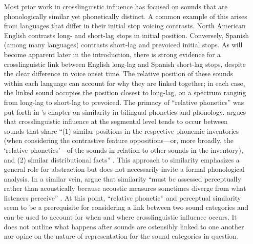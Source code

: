Most prior work in crosslinguistic influence has focused on sounds that are phonologically similar yet phonetically distinct. A common example of this arises from languages that differ in their initial stop voicing contrasts. North American English contrasts long- and short-lag stops in initial position. Conversely, Spanish (among many languages) contrasts short-lag and prevoiced initial stops. As will become apparent later in the introduction, there is strong evidence for a crosslinguistic link between English long-lag and Spanish short-lag stops, despite the clear difference in voice onset time. The relative position of these sounds within each language can account for why they are linked together; in each case, the linked sound occupies the position closest to long-lag, on a spectrum ranging from long-lag to short-lag to prevoiced. The primacy of ``relative phonetics'' was put forth in \citeauthor{chang_2015_similarity}'s \citeyearpar{chang_2015_similarity} chapter on similarity in bilingual phonetics and phonology. \citeauthor{chang_2015_similarity} argues that crosslinguistic influence at the segmental level tends to occur between sounds that share ``(1) similar positions in the respective phonemic inventories (when considering the contrastive feature oppositions---or, more broadly, the `relative phonetics'---of the sounds in relation to other sounds in the inventory), and (2) similar distributional facts'' \citeyearpar[][p. 201]{chang_2015_similarity}. This approach to similarity emphasizes a general role for abstraction but does not necessarily invite a formal phonological analysis. In a similar vein, \citeauthor{flege_2021_slmr} argue that similarity ``must be assessed perceptually rather than acoustically because acoustic measures sometimes diverge from what listeners perceive'' \citeyearpar[][p. 33]{flege_2021_slmr}. At this point, ``relative phonetic'' and perceptual similarity seem to be a prerequisite for considering a link between two sound categories and can be used to account for when and where crosslinguistic influence occurs. It does not outline what happens after sounds are ostensibly linked to one another nor opine on the nature of representation for the sound categories in question. 

